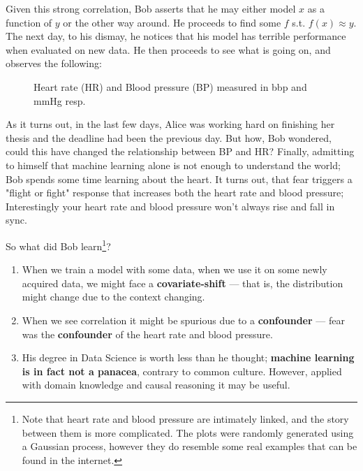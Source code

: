Given this strong correlation, Bob asserts that he may either model $x$ as a function of $y$ or the other way 
around. He proceeds to find some $f$ s.t. $f(x) \approx y$. The next day, to his dismay, he notices that his
model has terrible performance when evaluated on new data. He then proceeds to see what is going on, and 
observes the following:

\begin{figure}[htb]
    \centering
    \caption{Heart rate (HR) and Blood pressure (BP) measured in bbp and mmHg resp.}
\end{figure}

As it turns out, in the last few days, Alice was working hard on finishing her thesis and the deadline had been 
the previous day. But how, Bob wondered, could this have changed the relationship between BP and HR? 
Finally, admitting to himself that machine learning alone is not enough to understand the world; 
Bob spends some time learning about the heart. It turns out, that fear triggers a "flight or fight"
response that increases both the heart rate and blood pressure; Interestingly your heart rate and blood pressure 
won’t always rise and fall in sync.

So what did Bob learn\footnote{
    Note that heart rate and blood pressure are intimately linked, and the story between them is more complicated.
    The plots were randomly generated using a Gaussian process, however they do resemble some real examples that 
    can be found in the internet.
}?

\begin{enumerate}
    \item When we train a model with some data, when we use it on some newly acquired data, we might
    face a \textbf{covariate-shift} --- that is, the distribution might change due to the context changing.
    \item When we see correlation it might be spurious due to a \textbf{confounder} --- fear was the \textbf{confounder} 
    of the heart rate and blood pressure.
    \item His degree in Data Science is worth less than he thought; \textbf{machine learning is in fact not 
    a panacea}, contrary to common culture. However, applied with domain knowledge and causal reasoning
    it may be useful. 
\end{enumerate}

